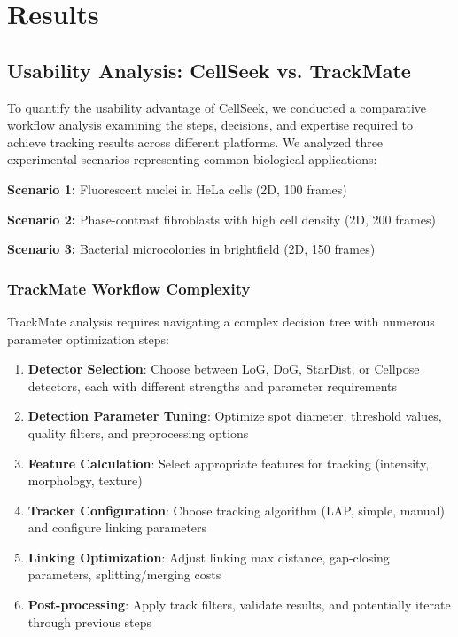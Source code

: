 \documentclass[../cellseek_paper.tex]{subfiles}
\begin{document}
\section{Results}

\subsection{Usability Analysis: CellSeek vs. TrackMate}

To quantify the usability advantage of CellSeek, we conducted a comparative workflow analysis examining the steps, decisions, and expertise required to achieve tracking results across different platforms. We analyzed three experimental scenarios representing common biological applications:

\textbf{Scenario 1:} Fluorescent nuclei in HeLa cells (2D, 100 frames)

\textbf{Scenario 2:} Phase-contrast fibroblasts with high cell density (2D, 200 frames)

\textbf{Scenario 3:} Bacterial microcolonies in brightfield (2D, 150 frames)

\subsubsection{TrackMate Workflow Complexity}

TrackMate analysis requires navigating a complex decision tree with numerous parameter optimization steps:

\begin{enumerate}
  \item \textbf{Detector Selection}: Choose between LoG, DoG, StarDist, or Cellpose detectors, each with different strengths and parameter requirements
  \item \textbf{Detection Parameter Tuning}: Optimize spot diameter, threshold values, quality filters, and preprocessing options
  \item \textbf{Feature Calculation}: Select appropriate features for tracking (intensity, morphology, texture)
  \item \textbf{Tracker Configuration}: Choose tracking algorithm (LAP, simple, manual) and configure linking parameters
  \item \textbf{Linking Optimization}: Adjust linking max distance, gap-closing parameters, splitting/merging costs
  \item \textbf{Post-processing}: Apply track filters, validate results, and potentially iterate through previous steps
\end{enumerate}
\end{document}
